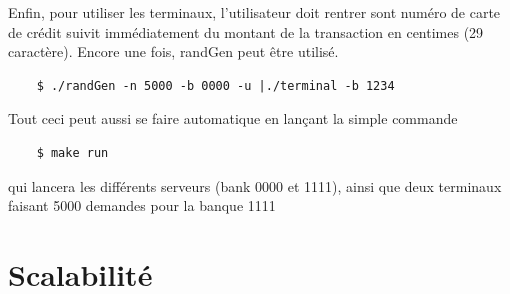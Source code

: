 \documentclass[french, a4paper, 12pt, titlepage]{article}
\begin{document}
Enfin, pour utiliser les terminaux, l'utilisateur doit rentrer sont numéro de carte de crédit suivit immédiatement du montant de la transaction en centimes (29 caractère).
Encore une fois, randGen peut être utilisé.
\begin{verbatim}
	$ ./randGen -n 5000 -b 0000 -u |./terminal -b 1234
\end{verbatim}

Tout ceci peut aussi se faire automatique en lançant la simple commande
\begin{verbatim}
	$ make run
\end{verbatim}
qui lancera les différents serveurs (bank 0000 et 1111), ainsi que deux terminaux faisant 5000 demandes pour la banque 1111

\section{Scalabilité}
\end{document}
